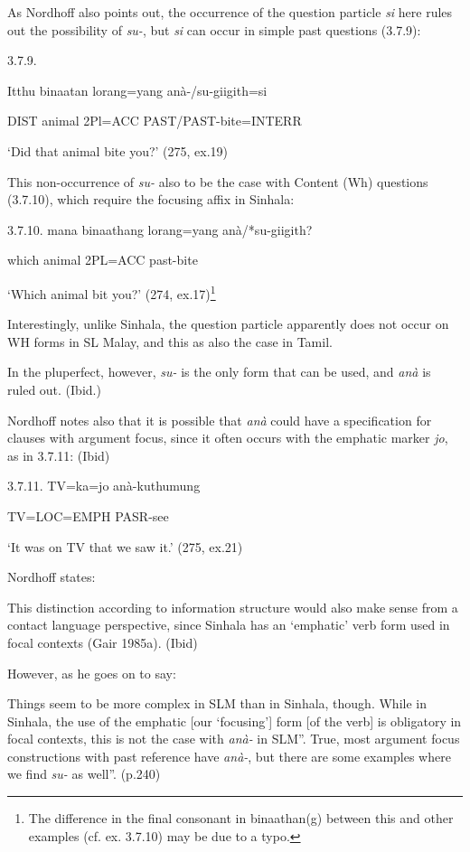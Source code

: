 \documentclass[letterpaper]{article}
\begin{document}
As Nordhoff also points out, the occurrence of the question particle \textit{si }here rules out the possibility of \textit{su-}, but \textit{si} can occur in simple past questions (3.7.9):

 3.7.9.

\ea
\gll   Itthu binaatan lorang=yang  anà-/su-giigith=si

  DIST animal 2Pl=ACC PAST/PAST-bite=INTERR

  `Did that animal bite you?' (275, ex.19)

This non-occurrence of \textit{su-} also to be the case with Content (Wh) questions (3.7.10), which require the focusing affix in Sinhala:

 3.7.10.
\ea
\gll  mana binaathang lorang=yang anà/*su-giigith?

  which animal 2PL=ACC past-bite

  `Which animal bit you?' (274, ex.17)\footnote{The
  difference in the final consonant in binaathan(g) between this and other examples (cf. ex. 3.7.10) may be due to a typo.
}

 Interestingly, unlike Sinhala, the question particle apparently does not occur on WH forms in SL Malay, and this as also the case in Tamil.

  In the pluperfect, however, \textit{su-} is the only form that can be used, and \textit{anà }is ruled out. (Ibid.)

Nordhoff notes also that it is possible that \textit{anà }could have a specification for clauses with argument focus, since it often occurs with the emphatic marker \textit{jo}, as in 3.7.11: (Ibid)

 3.7.11.
\ea
\gll TV=ka=jo anà-kuthumung

  TV=LOC=EMPH PASR-see

  `It was on TV that we saw it.' (275, ex.21)

Nordhoff states:

 This distinction according to information structure would also make sense from a contact language perspective, since Sinhala has an `emphatic' verb form used in focal contexts (Gair 1985a). (Ibid)

 However, as he goes on to say:

Things seem to be more complex in SLM than in Sinhala, though. While in Sinhala, the use of the emphatic [our `focusing'] form [of the verb] is obligatory in focal contexts, this is not the case with \textit{anà-} in SLM''. True, most argument focus constructions with past reference have \textit{anà-}, but there are some examples where we find \textit{su-} as well''. (p.240)
\end{document}
